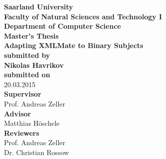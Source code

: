 \begin{titlepage}
\begin{center}
{\LARGE \bfseries Saarland University \\
Faculty of Natural Sciences and Technology I \\[0.1cm]
Department of Computer Science}\\[2.5cm]

{\Large \bfseries Master's Thesis}\\[1cm]
{\LARGE \bfseries Adapting XMLMate to Binary Subjects}\\[2cm]
{\small \bfseries submitted by}\\[0.5cm]
{\large \bfseries Nikolas Havrikov}\\[1cm]
{\small \bfseries submitted on}\\
20.03.2015\\[2.5cm]
{\bfseries Supervisor}\\[0.2cm]
Prof. Andreas Zeller\\[1cm]
{\bfseries Advisor}\\[0.2cm]
Matthias Höschele\\[1cm]
{\bfseries Reviewers}\\[0.2cm]
Prof. Andreas Zeller\\[.2cm]
Dr. Christian Rossow
\end{center}
\end{titlepage}